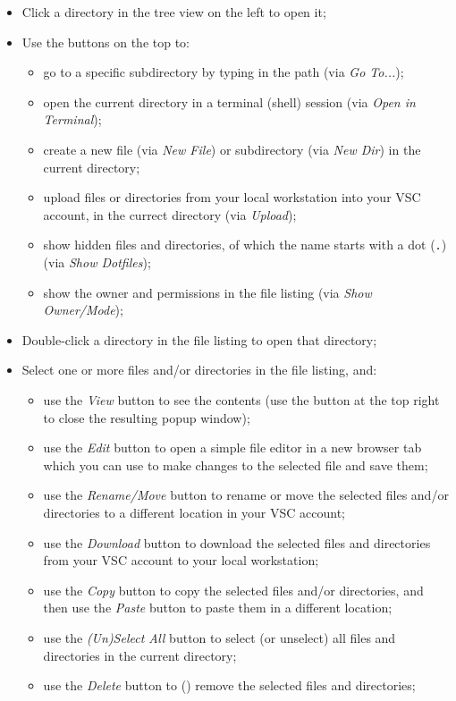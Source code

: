 \begin{itemize}
    \item Click a directory in the tree view on the left to open it;
    \item Use the buttons on the top to:
    \begin{itemize}
        \item go to a specific subdirectory by typing in the path (via \emph{Go To...});
        \item open the current directory in a terminal (shell) session (via \emph{Open in Terminal});
        \item create a new file (via \emph{New File}) or subdirectory (via \emph{New Dir}) in the current directory;
        \item upload files or directories from your local workstation into your VSC account, in the currect directory (via \emph{Upload});
        \item show hidden files and directories, of which the name starts with a dot (\lstinline|.|) (via \emph{Show Dotfiles});
        \item show the owner and permissions in the file listing (via \emph{Show Owner/Mode});
    \end{itemize}
    \item Double-click a directory in the file listing to open that directory;
    \item Select one or more files and/or directories in the file listing, and:
    \begin{itemize}
        \item use the \emph{View} button to see the contents (use the button at the top right to close the resulting popup window);
        \item use the \emph{Edit} button to open a simple file editor in a new browser tab which you can use to make changes to the selected file and save them;
        \item use the \emph{Rename/Move} button to rename or move the selected files and/or directories to a different location in your VSC account;
        \item use the \emph{Download} button to download the selected files and directories from your VSC account to your local workstation;
        \item use the \emph{Copy} button to copy the selected files and/or directories, and then use the \emph{Paste} button to paste them in a different location;
        \item use the \emph{(Un)Select All} button to select (or unselect) all files and directories in the current directory;
        \item use the \emph{Delete} button to () remove the selected files and directories;
    \end{itemize}
\end{itemize}

